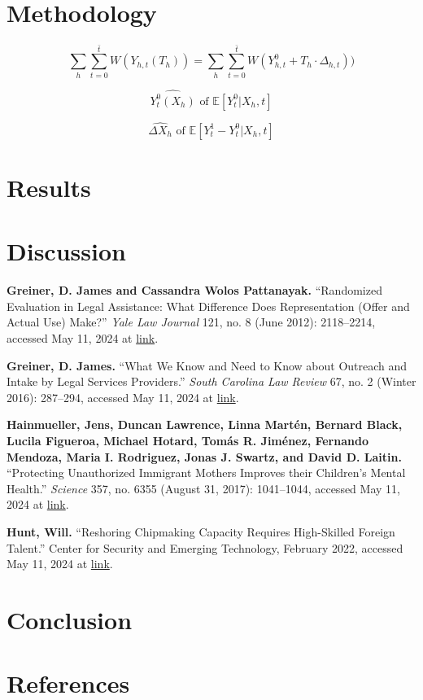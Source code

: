 \documentclass{article}
\begin{document}
\section{Methodology}

\[ \sum_{h} \sum_{t=0}^{\bar t} W(Y_{h,t}(T_h)) = 
\sum_{h} \sum_{t=0}^{\bar t} W(Y_{h,t}^0 + T_h \cdot \Delta_{h,t}))
\]

\[ \hat{Y_t^0(X_h)} \text{ of } \mathbb{E} [Y_t^0 \rvert X_h ,t ] \]

\[ \hat{\Delta X_h} \text{ of } \mathbb{E} [Y_t^1 - Y_t^0 \rvert X_h ,t ] \]  

\section{Results}

\section{Discussion}

\begin{hangparas}{.25in}{1}

\textbf{Greiner, D. James and Cassandra Wolos Pattanayak. }“Randomized Evaluation in Legal Assistance: What Difference Does Representation (Offer and Actual Use) Make?” \textit{Yale Law Journal} 121, no. 8 (June 2012): 2118–2214, accessed May 11, 2024 at \href{https://tinyurl.com/m3e27cbm}{link}.

\textbf{Greiner, D. James.} “What We Know and Need to Know about Outreach and Intake by Legal Services Providers.” \textit{South Carolina Law Review} 67, no. 2 (Winter 2016): 287–294, accessed May 11, 2024 at \href{https://scholarcommons.sc.edu/sclr/vol67/iss2/8/}{link}.

\textbf{Hainmueller, Jens, Duncan Lawrence, Linna Martén, Bernard Black, Lucila Figueroa, Michael Hotard, Tomás R. Jiménez, Fernando Mendoza, Maria I. Rodriguez, Jonas J. Swartz, and David D. Laitin.} “Protecting Unauthorized Immigrant Mothers Improves their Children’s Mental Health.” \textit{Science} 357, no. 6355 (August 31, 2017): 1041–1044, accessed May 11, 2024 at \href{https://www.science.org/doi/10.1126/science.aan5893}{link}.

\textbf{Hunt, Will. }“Reshoring Chipmaking Capacity Requires High-Skilled Foreign Talent.” Center for Security and Emerging Technology, February 2022, accessed May 11, 2024 at \href{https://doi.org/10.51593/20210065}{link}.

\end{hangparas}

\section{Conclusion}
\section{References}
\end{document}
